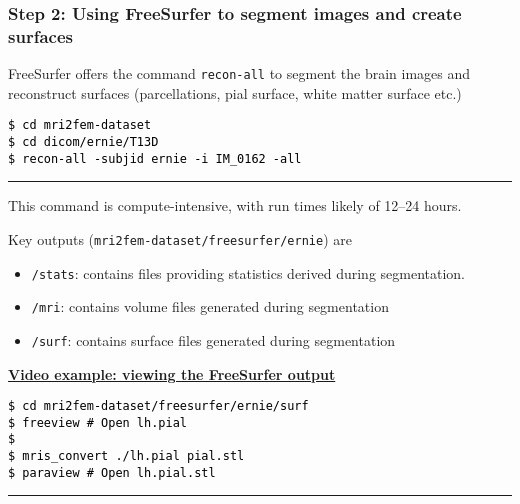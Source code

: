 \documentclass[10pt, mathserif, aspectratio=169, t, usenames, dvipsnames]{beamer}
\newcommand{\videosection}[3]{\begin{frame} \begin{center} \vspace{3em} \href{#2}{\textcolor{rognesred}{\textbf{#1}}} \end{center} #3 \end{frame}}
\def\formtmpX#1#2{{\vskip3pt\noindent\fboxsep=0pt{\parbox{\textwidth}{\hbox to \textwidth{\hskip3pt\vbox{\raggedright\noindent\textbf{#2\vphantom{Qy}}}\hfill}}}\vskip3pt\par
\noindent\kern0pt}}
\newenvironment{programcode}[1]{\ignorespaces\def\stmtopen##1{##1}%
\formtmpX{programcode}{\centerline{\small{#1}}}}{\noindent\textcolor{programcode}{\rule{\columnwidth}{0pt}}\par\addvspace{\baselineskip}}%
\newcommand{\terminal}[1]{
  \vspace{-1em}
  \begin{programcode}{}%
    \colorbox{blue!10}{\parbox{0.98\textwidth}{\textcolor{black}{\texttt{#1}}}}
  \end{programcode}
  \vspace{-0.5em}
}
\newcommand{\emp}[1]{\texttt{#1}}
\begin{document}
\begin{frame}
\frametitle{Step 2: Using FreeSurfer to segment images and create surfaces}

FreeSurfer offers the command \emp{recon-all} to segment the brain
images and reconstruct surfaces (parcellations, pial surface, white
matter surface etc.)

\terminal{\$ cd mri2fem-dataset \\
\$ cd dicom/ernie/T13D \\
\$ recon-all -subjid ernie -i IM\_0162 -all}

This command is compute-intensive, with run times likely of 12--24
hours.

Key outputs (\emp{mri2fem-dataset/freesurfer/ernie}) are 
\begin{itemize}
\item \emp{/stats}: contains files providing statistics derived during segmentation.
\item \emp{/mri}: contains volume files generated during segmentation
\item \emp{/surf}: contains surface files generated during segmentation
\end{itemize}
\end{frame}

\videosection{Video example: viewing the FreeSurfer output}{https://youtu.be/Svz3kYfsCQo}
{\terminal{\$ cd mri2fem-dataset/freesurfer/ernie/surf \\
\$ freeview \# Open lh.pial \\
\$ \\
\$ mris\_convert ./lh.pial pial.stl \\
\$ paraview \# Open lh.pial.stl}
}
\end{document}
